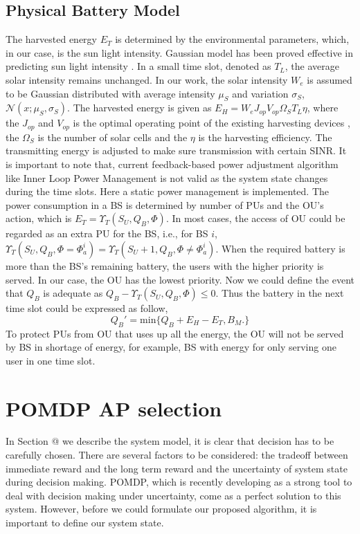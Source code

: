 \documentclass[conference]{IEEEtran}
\makeatletter
\newcommand{\Rmnum}[1]{\expandafter\@slowromancap\romannumeral #1@}
\makeatother
\begin{document}
\subsection{Physical Battery Model}
The harvested energy \(E_T\) is determined by the environmental parameters,
which, in our case, is the sun light intensity.
Gaussian model has been proved effective in predicting sun light intensity \cite{gaussian,data}.
In a small time slot, denoted as \(T_L\), the average solar intensity remains unchanged.
In our work, the solar intensity \(W_e\) is assumed to be
Gaussian distributed with average intensity \(\mu_S\) and variation \(\sigma_S\), \(\mathcal{N}\left(x;\mu_S,\sigma_S\right)\).
The harvested energy is given as \(E_H = W_eJ_{op}V_{op}\Omega_ST_L\eta\),
where the \(J_{op}\) and \(V_{op}\) is the optimal operating point of the existing harvesting devices \cite{physic},
the \(\Omega_S\) is the number of solar cells and the \(\eta\) is the harvesting efficiency.
The transmitting energy is adjusted to make sure transmission with certain SINR.
It is important to note that, current feedback-based power adjustment algorithm
like Inner Loop Power Management is not valid as the system state changes during the time slots.
Here a static power management is implemented.
The power consumption in a BS is determined by number of PUs and the OU's action,
which is \(E_T = \Upsilon_T(S_U, Q_B, \Phi)\).
In most cases, the access of OU could be regarded as an extra PU for the BS, i.e., for BS \(i\),
\(\Upsilon_T(S_U, Q_B, \Phi = \Phi_{a}^{i}) = \Upsilon_T(S_U + 1, Q_B, \Phi \ne \Phi_{a}^i)\).
When the required battery is more than the BS's remaining battery,
the users with the higher priority is served.
In our case, the OU has the lowest priority.
Now we could define the event that \(Q_B\) is adequate as \(Q_B- \Upsilon_T(S_U, Q_B, \Phi) \leq 0\).
Thus the battery in the next time slot could be expressed as follow,
\begin{equation}
	Q_B' = \mbox{min}\{Q_B + E_H - E_T, B_M.\}
\end{equation}
To protect PUs from OU that uses up all the energy, the OU will not be served by BS in shortage of energy,
for example, BS with energy for only serving one user in one time slot.
\section{POMDP AP selection}
In Section \Rmnum{2} we describe the system model, it is clear that decision has to be carefully chosen.
There are several factors to be considered: the tradeoff between immediate reward and the long term reward and
the uncertainty of system state during decision making.
POMDP, which is recently developing as a strong tool to deal with decision making under uncertainty,
come as a perfect solution to this system.
However, before we could formulate our proposed algorithm, it is important to define our system state.
\end{document}
